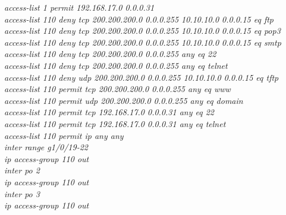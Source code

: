 \documentclass[a4paper, 12pt]{article}
\begin{document}
\hspace*{2cm}\textit{access-list 1 permit 192.168.17.0 0.0.0.31\\
\hspace*{2cm}access-list 110 deny tcp 200.200.200.0 0.0.0.255 10.10.10.0 0.0.0.15 eq ftp\\
\hspace*{2cm}access-list 110 deny tcp 200.200.200.0 0.0.0.255 10.10.10.0 0.0.0.15 eq pop3\\
\hspace*{2cm}access-list 110 deny tcp 200.200.200.0 0.0.0.255 10.10.10.0 0.0.0.15 eq smtp\\
\hspace*{2cm}access-list 110 deny tcp 200.200.200.0 0.0.0.255 any eq 22\\
\hspace*{2cm}access-list 110 deny tcp 200.200.200.0 0.0.0.255 any eq telnet\\
\hspace*{2cm}access-list 110 deny udp 200.200.200.0 0.0.0.255 10.10.10.0 0.0.0.15 eq tftp\\
\hspace*{2cm}access-list 110 permit tcp 200.200.200.0 0.0.0.255 any eq www\\
\hspace*{2cm}access-list 110 permit udp 200.200.200.0 0.0.0.255 any eq domain\\
\hspace*{2cm}access-list 110 permit tcp 192.168.17.0 0.0.0.31 any eq 22\\
\hspace*{2cm}access-list 110 permit tcp 192.168.17.0 0.0.0.31 any eq telnet\\
\hspace*{2cm}access-list 110 permit ip any any\\
\hspace*{2cm}inter range g1/0/19-22\\
\hspace*{2cm}ip access-group 110 out\\
\hspace*{2cm}inter po 2\\
\hspace*{2cm}ip access-group 110 out\\
\hspace*{2cm}inter po 3\\
\hspace*{2cm}ip access-group 110 out\\
}
\end{document}

